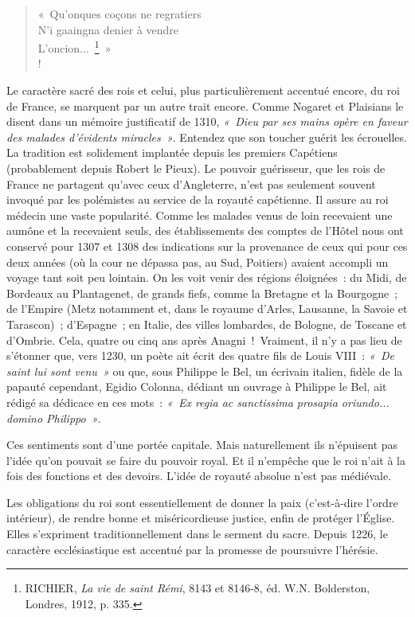 \documentclass[french,twoside]{book} %
\begin{document}
\begin{verse}
« Qu’onques coçons ne regratiers\\
N’i gaaingna denier à vendre\\
L’oncion... \footnote{ RICHIER, {\itshape La vie de saint Rémi}, 8143 et 8146-8, éd. W.N. Bolderston, Londres, 1912, p. 335.} »\\!
\end{verse}
\noindent Le caractère sacré des rois et celui, plus particulièrement accentué encore, du roi de France, se marquent par un autre trait encore. Comme Nogaret et Plaisians le disent dans un mémoire  
\label{p18} justificatif de 1310, \emph{« Dieu par ses mains opère en faveur des malades d’évidents miracles »}. Entendez que son toucher guérit les écrouelles. La tradition est solidement implantée depuis les premiers Capétiens (probablement depuis Robert le Pieux). Le pouvoir guérisseur, que les rois de France ne partagent qu’avec ceux d’Angleterre, n’est pas seulement souvent invoqué par les polémistes au service de la royauté capétienne. Il assure au roi médecin une vaste popularité. Comme les malades venus de loin recevaient une aumône et la recevaient seuls, des établissements des comptes de l’Hôtel nous ont conservé pour 1307 et 1308 des indications sur la provenance de ceux qui pour ces deux années (où la cour ne dépassa pas, au Sud, Poitiers) avaient accompli un voyage tant soit peu lointain. On les voit venir des régions éloignées : du Midi, de Bordeaux au Plantagenet, de grands fiefs, comme la Bretagne et la Bourgogne ; de l’Empire (Metz notamment et, dans le royaume d’Arles, Lausanne, la Savoie et Tarascon) ; d’Espagne ; en Italie, des villes lombardes, de Bologne, de Toscane et d’Ombrie. Cela, quatre ou cinq ans après Anagni ! Vraiment, il n’y a pas lieu de s’étonner que, vers 1230, un poète ait écrit des quatre fils de Louis VIII : \emph{« De saint lui sont venu »} ou que, sous Philippe le Bel, un écrivain italien, fidèle de la papauté cependant, Egidio Colonna, dédiant un ouvrage à Philippe le Bel, ait rédigé sa dédicace en ces mots : \emph{« Ex regia ac sanctissima prosapia oriundo... domino Philippo »}.\par
Ces sentiments sont d’une portée capitale. Mais naturellement ils n’épuisent pas l’idée qu’on pouvait se faire du pouvoir royal. Et il n’empêche que le roi n’ait à la fois des fonctions et des devoirs. L’idée de royauté absolue n’est pas médiévale.\par
Les obligations du roi sont essentiellement de donner la paix (c’est-à-dire l’ordre intérieur), de rendre bonne et miséricordieuse justice, enfin de protéger l’Église. Elles s’expriment traditionnellement dans le serment du sacre. Depuis 1226, le caractère ecclésiastique est accentué par la promesse de poursuivre l’hérésie.\par
\end{document}
